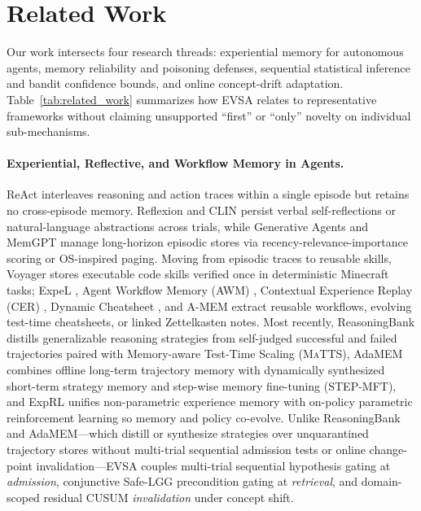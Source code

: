 \documentclass[10pt,letterpaper]{article}
\begin{document}
\section{Related Work}
Our work intersects four research threads: experiential memory for autonomous agents, memory reliability and poisoning defenses, sequential statistical inference and bandit confidence bounds, and online concept-drift adaptation. Table~\ref{tab:related_work} summarizes how EVSA relates to representative frameworks without claiming unsupported ``first'' or ``only'' novelty on individual sub-mechanisms.

\paragraph{Experiential, Reflective, and Workflow Memory in Agents.}
ReAct \cite{yao2023react} interleaves reasoning and action traces within a single episode but retains no cross-episode memory. Reflexion \cite{shinn2023reflexion} and CLIN \cite{majumder2024clin} persist verbal self-reflections or natural-language abstractions across trials, while Generative Agents \cite{park2023generative} and MemGPT \cite{packer2023memgpt} manage long-horizon episodic stores via recency-relevance-importance scoring or OS-inspired paging. Moving from episodic traces to reusable skills, Voyager \cite{wang2024voyager} stores executable code skills verified once in deterministic Minecraft tasks; ExpeL \cite{zhao2024expel}, Agent Workflow Memory (AWM) \cite{wang2025awm}, Contextual Experience Replay (CER) \cite{liu2025cer}, Dynamic Cheatsheet \cite{suzgun2026dynamic}, and A-MEM \cite{xu2025amem} extract reusable workflows, evolving test-time cheatsheets, or linked Zettelkasten notes. Most recently, ReasoningBank \cite{ouyang2026reasoningbank} distills generalizable reasoning strategies from self-judged successful and failed trajectories paired with Memory-aware Test-Time Scaling (\textsc{MaTTS}), AdaMEM \cite{zhang2026adamem} combines offline long-term trajectory memory with dynamically synthesized short-term strategy memory and step-wise memory fine-tuning (\textsc{STEP-MFT}), and ExpRL \cite{jin2026exprl} unifies non-parametric experience memory with on-policy parametric reinforcement learning so memory and policy co-evolve. Unlike ReasoningBank and AdaMEM—which distill or synthesize strategies over unquarantined trajectory stores without multi-trial sequential admission tests or online change-point invalidation—EVSA couples multi-trial sequential hypothesis gating at \emph{admission}, conjunctive Safe-LGG precondition gating at \emph{retrieval}, and domain-scoped residual CUSUM \emph{invalidation} under concept shift.
\end{document}
